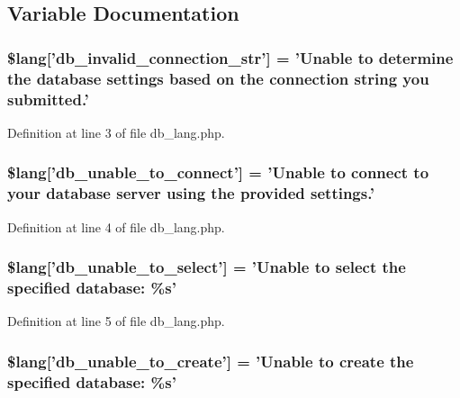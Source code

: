 \subsection{Variable Documentation}
\hypertarget{db__lang_8php_a0c2ed2613101d37cbaba14042530c16d}{
\subsubsection[{\$lang}]{\setlength{\rightskip}{0pt plus 5cm}\$lang\mbox{[}'db\-\_\-invalid\-\_\-connection\-\_\-str'\mbox{]} = 'Unable {\bf to} determine the database settings based on the connection string you submitted.'}}\label{db__lang_8php_a0c2ed2613101d37cbaba14042530c16d}


Definition at line 3 of file db\-\_\-lang.\-php.

\hypertarget{db__lang_8php_aa5935b86c957eb15ac7d41cf84143d66}{
\subsubsection[{\$lang}]{\setlength{\rightskip}{0pt plus 5cm}\$lang\mbox{[}'db\-\_\-unable\-\_\-to\-\_\-connect'\mbox{]} = 'Unable {\bf to} connect {\bf to} your database server using the provided settings.'}}\label{db__lang_8php_aa5935b86c957eb15ac7d41cf84143d66}


Definition at line 4 of file db\-\_\-lang.\-php.

\hypertarget{db__lang_8php_a3c93974df838c0e036690874108715ea}{
\subsubsection[{\$lang}]{\setlength{\rightskip}{0pt plus 5cm}\$lang\mbox{[}'db\-\_\-unable\-\_\-to\-\_\-select'\mbox{]} = 'Unable {\bf to} select the specified database\-: \%s'}}\label{db__lang_8php_a3c93974df838c0e036690874108715ea}


Definition at line 5 of file db\-\_\-lang.\-php.

\hypertarget{db__lang_8php_a4266e3b235feb16d9cf2e88afd1fedac}{
\subsubsection[{\$lang}]{\setlength{\rightskip}{0pt plus 5cm}\$lang\mbox{[}'db\-\_\-unable\-\_\-to\-\_\-create'\mbox{]} = 'Unable {\bf to} create the specified database\-: \%s'}}\label{db__lang_8php_a4266e3b235feb16d9cf2e88afd1fedac}


